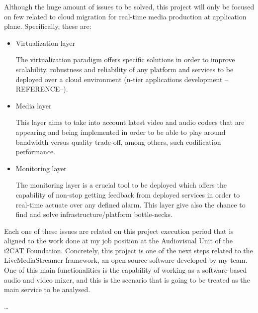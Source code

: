 Although the huge amount of issues to be solved, this project will only be focused on few related to cloud migration for real-time media production at application plane. Specifically, these are:

\begin{itemize}
\item Virtualization layer \hfill 

The virtualization paradigm offers specific solutions in order to improve scalability, robustness and reliability of any platform and services to be deployed over a cloud environment (n-tier applications development --REFERENCE--). 

\item Media layer \hfill 

This layer aims to take into account latest video and audio codecs that are appearing and being implemented in order to be able to play around bandwidth versus quality trade-off, among others, such codification performance. 

\item Monitoring layer \hfill 

The monitoring layer is a crucial tool to be deployed which offers the capability of non-stop getting feedback from deployed services in order to real-time actuate over any defined alarm. This layer give also the chance to find and solve infrastructure/platform bottle-necks.
\end{itemize}

Each one of these issues are related on this project execution period that is aligned to the work done at my job position at the Audiovisual Unit of the i2CAT Foundation. Concretely, this project is one of the next steps related to the LiveMediaStreamer framework, an open-source software developed by my team. One of this main functionalities is the capability of working as a software-based audio and video mixer, and this is the scenario that is going to be treated as the main service to be analysed.

\ldots







